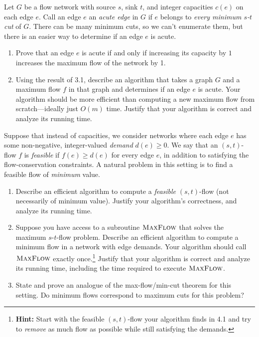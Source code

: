 \documentclass[11pt]{article}
\theoremstyle{definition}
\begin{document}
\begin{enumerate}[leftmargin=0pt, itemsep=3ex]
\problemitem
Let $G$ be a flow network with source $s$, sink $t$, and integer
capacities $c(e)$ on each edge $e$.  Call an edge $e$ an \emph{acute edge} in
$G$ if $e$ belongs to \emph{every minimum $s$-$t$ cut} of $G$.  There can be many minimum cuts, so we can't enumerate them, but there is an easier way to determine if an edge $e$ is acute.

\begin{enumerate}[leftmargin=0pt, itemsep=1ex]
	\item Prove that an edge $e$ is acute if and only if
	increasing its capacity by $1$ increases the maximum flow of the
	network by 1.
	
	\item Using the result of 3.1, describe an algorithm that takes a graph $G$ and a maximum flow $f$ in that graph and determines if an edge $e$ is acute.  Your algorithm should be more efficient than computing a new maximum flow from scratch---ideally just $O(m)$ time.  Justify that your algorithm is correct and analyze its running time.
\end{enumerate}
	
\problemitem 
Suppose that instead of capacities, we consider networks where each edge $e$ has some non-negative, integer-valued \emph{demand} $d(e) \geq 0$.  We say that an $(s,t)$-flow $f$ is \emph{feasible} if $f(e) \geq d(e)$ for every edge $e$, in addition to satisfying the flow-conservation constraints.  A natural problem in this setting is to find a feasible flow of \emph{minimum} value.
\begin{enumerate}[leftmargin=0pt, itemsep=1ex]
	\item Describe an efficient algorithm to compute a \emph{feasible} $(s,t)$-flow (not necessarily of minimum value).  Justify your algorithm's correctness, and analyze its running time.
	
	\item Suppose you have access to a subroutine $\textsc{MaxFlow}$ that solves the maximum $s$-$t$-flow problem. Describe an efficient algorithm to compute a minimum flow in a network with edge demands.  Your algorithm should call $\textsc{MaxFlow}$ exactly once.\footnote{\textbf{Hint:} Start with the feasible $(s,t)$-flow your algorithm finds in 4.1 and try to \emph{remove} as much flow as possible while still satisfying the demands.}  Justify that your algorithm is correct and analyze its running time, including the time required to execute $\textsc{MaxFlow}$.
	
	\item State and prove an analogue of the max-flow/min-cut theorem for this setting.  Do minimum flows correspond to maximum cuts for this problem?
\end{enumerate}

\end{enumerate}
\end{document}

